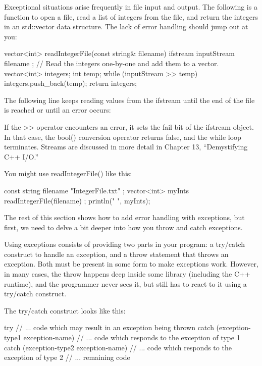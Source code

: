 
Exceptional situations arise frequently in file input and output. The following is a function to open a file, read a list of integers from the file, and return the integers in an std::vector data structure. The lack of error handling should jump out at you:

\begin{cpp}
vector<int> readIntegerFile(const string& filename)
{
    ifstream inputStream { filename };
    // Read the integers one-by-one and add them to a vector.
    vector<int> integers;
    int temp;
    while (inputStream >> temp) {
        integers.push_back(temp);
    }
    return integers;
}
\end{cpp}

The following line keeps reading values from the ifstream until the end of the file is reached or until an error occurs:

\begin{cpp}
while (inputStream >> temp) {
\end{cpp}

If the >> operator encounters an error, it sets the fail bit of the ifstream object. In that case, the bool() conversion operator returns false, and the while loop terminates. Streams are discussed in more detail in Chapter 13, “Demystifying C++ I/O.”

You might use readIntegerFile() like this:

\begin{cpp}
const string filename { "IntegerFile.txt" };
vector<int> myInts { readIntegerFile(filename) };
println("{} ", myInts);
\end{cpp}

The rest of this section shows how to add error handling with exceptions, but first, we need to delve a bit deeper into how you throw and catch exceptions.


Using exceptions consists of providing two parts in your program: a try/catch construct to handle an exception, and a throw statement that throws an exception. Both must be present in some form to make exceptions work. However, in many cases, the throw happens deep inside some library (including the C++ runtime), and the programmer never sees it, but still has to react to it using a try/catch construct.

The try/catch construct looks like this:

\begin{cpp}
try {
    // ... code which may result in an exception being thrown
} catch (exception-type1 exception-name) {
    // ... code which responds to the exception of type 1
} catch (exception-type2 exception-name) {
    // ... code which responds to the exception of type 2
}
// ... remaining code
\end{cpp}

